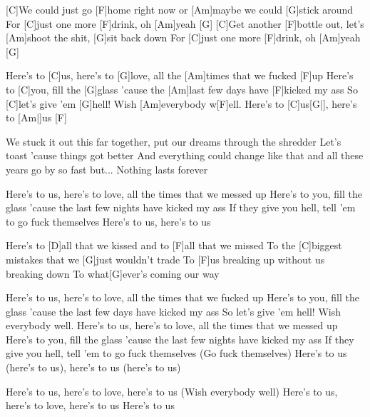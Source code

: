 


\begin{guitar}
	[C]We could just go [F]home right now or [Am]maybe we could [G]stick around
	For [C]just one more [F]drink, oh [Am]yeah [G]{}
	[C]Get another [F]bottle out, let's [Am]shoot the shit, [G]sit back down
	For [C]just one more [F]drink, oh [Am]yeah [G]{}
	
	Here's to [C]us, here's to [G]love, all the [Am]times that we fucked [F]up
	Here's to [C]you, fill the [G]glass 'cause the [Am]last few days have [F]kicked my ass
	So [C]let's give 'em [G]hell! Wish [Am]everybody w[F]ell.
	Here's to [C]us[G|], here's to [Am|]{us} [F]{}
	
	We stuck it out this far together, put our dreams through the shredder
	Let's toast 'cause things got better
	And everything could change like that and all these years go by so fast but...
	Nothing lasts forever
	
	Here's to us, here's to love, all the times that we messed up
	Here's to you, fill the glass 'cause the last few nights have kicked my ass
	If they give you hell, tell 'em to go fuck themselves
	Here's to us, here's to us
	
	Here's to [D]all that we kissed and to [F]all that we missed
	To the [C]biggest mistakes that we [G]just wouldn't trade
	To [F]us breaking up without us breaking down
	To what[G]ever's coming our way
	
	Here's to us, here's to love, all the times that we fucked up
	Here's to you, fill the glass 'cause the last few days have kicked my ass
	So let's give 'em hell! Wish everybody well.
	Here's to us, here's to love, all the times that we messed up
	Here's to you, fill the glass 'cause the last few nights have kicked my ass
	If they give you hell, tell 'em to go fuck themselves (Go fuck themselves)
	Here's to us (here's to us), here's to us (here's to us)
	
	Here's to us, here's to love, here's to us (Wish everybody well)
	Here's to us, here's to love, here's to us
	Here's to us
\end{guitar}